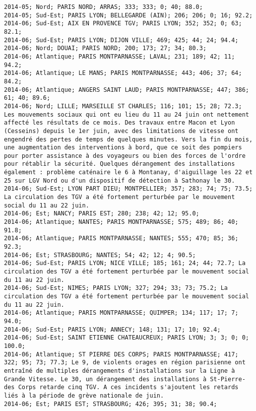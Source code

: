 \documentclass{article}
\begin{document}
\begin{Verbatim}[commandchars=\\\{\}]
2014-05; Nord; PARIS NORD; ARRAS; 333; 333; 0; 40; 88.0; 
2014-05; Sud-Est; PARIS LYON; BELLEGARDE (AIN); 206; 206; 0; 16; 92.2; 
2014-06; Sud-Est; AIX EN PROVENCE TGV; PARIS LYON; 352; 352; 0; 63; 82.1; 
2014-06; Sud-Est; PARIS LYON; DIJON VILLE; 469; 425; 44; 24; 94.4; 
2014-06; Nord; DOUAI; PARIS NORD; 200; 173; 27; 34; 80.3; 
2014-06; Atlantique; PARIS MONTPARNASSE; LAVAL; 231; 189; 42; 11; 94.2; 
2014-06; Atlantique; LE MANS; PARIS MONTPARNASSE; 443; 406; 37; 64; 84.2; 
2014-06; Atlantique; ANGERS SAINT LAUD; PARIS MONTPARNASSE; 447; 386; 61; 40; 89.6; 
2014-06; Nord; LILLE; MARSEILLE ST CHARLES; 116; 101; 15; 28; 72.3; Les mouvements sociaux qui ont eu lieu du 11 au 24 juin ont nettement affecté les résultats de ce mois. Des travaux entre Macon et Lyon (Cesseins) depuis le 1er juin, avec des limitations de vitesse ont engendré des pertes de temps de quelques minutes. Vers la fin du mois, une augmentation des interventions à bord, que ce soit des pompiers pour porter assistance à des voyageurs ou bien des forces de l'ordre pour rétablir la sécurité. Quelques dérangement des installations également : problème caténaire le 6 à Montanay, d'aiguillage les 22 et 25 sur LGV Nord ou d'un dispositif de détection à Sathonay le 30.
2014-06; Sud-Est; LYON PART DIEU; MONTPELLIER; 357; 283; 74; 75; 73.5; La circulation des TGV a été fortement perturbée par le mouvement social du 11 au 22 juin.
2014-06; Est; NANCY; PARIS EST; 280; 238; 42; 12; 95.0; 
2014-06; Atlantique; NANTES; PARIS MONTPARNASSE; 575; 489; 86; 40; 91.8; 
2014-06; Atlantique; PARIS MONTPARNASSE; NANTES; 555; 470; 85; 36; 92.3; 
2014-06; Est; STRASBOURG; NANTES; 54; 42; 12; 4; 90.5; 
2014-06; Sud-Est; PARIS LYON; NICE VILLE; 185; 161; 24; 44; 72.7; La circulation des TGV a été fortement perturbée par le mouvement social du 11 au 22 juin.
2014-06; Sud-Est; NIMES; PARIS LYON; 327; 294; 33; 73; 75.2; La circulation des TGV a été fortement perturbée par le mouvement social du 11 au 22 juin.
2014-06; Atlantique; PARIS MONTPARNASSE; QUIMPER; 134; 117; 17; 7; 94.0; 
2014-06; Sud-Est; PARIS LYON; ANNECY; 148; 131; 17; 10; 92.4; 
2014-06; Sud-Est; SAINT ETIENNE CHATEAUCREUX; PARIS LYON; 3; 3; 0; 0; 100.0; 
2014-06; Atlantique; ST PIERRE DES CORPS; PARIS MONTPARNASSE; 417; 322; 95; 73; 77.3; Le 9, de violents orages en région parisienne ont entraîné de multiples dérangements d'installations sur la Ligne à Grande Vitesse. Le 30, un dérangement des installations à St-Pierre-des Corps retarde cinq TGV. A ces incidents s'ajoutent les retards liés à la période de grève nationale de juin.
2014-06; Est; PARIS EST; STRASBOURG; 426; 395; 31; 38; 90.4; 

\end{Verbatim}
\end{document}
